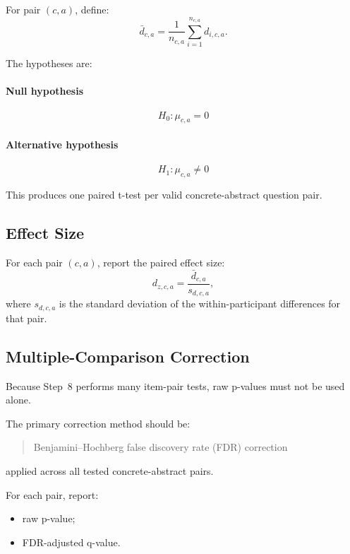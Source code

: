 For pair \((c,a)\), define:
\begin{equation}
\bar{d}_{c,a} = \frac{1}{n_{c,a}} \sum_{i=1}^{n_{c,a}} d_{i,c,a}.
\end{equation}

The hypotheses are:

\paragraph{Null hypothesis}
\begin{equation}
H_0: \mu_{c,a} = 0
\end{equation}

\paragraph{Alternative hypothesis}
\begin{equation}
H_1: \mu_{c,a} \neq 0
\end{equation}

This produces one paired t-test per valid concrete-abstract question pair.

\subsection{Effect Size}
For each pair \((c,a)\), report the paired effect size:
\begin{equation}
d_{z,c,a} = \frac{\bar{d}_{c,a}}{s_{d,c,a}},
\end{equation}
where \(s_{d,c,a}\) is the standard deviation of the within-participant differences for that pair.

\subsection{Multiple-Comparison Correction}
Because Step~8 performs many item-pair tests, raw p-values must not be used alone.

The primary correction method should be:
\begin{quote}
Benjamini--Hochberg false discovery rate (FDR) correction
\end{quote}
applied across all tested concrete-abstract pairs.

For each pair, report:
\begin{itemize}
    \item raw p-value;
    \item FDR-adjusted q-value.
\end{itemize}


